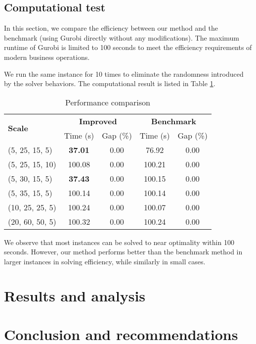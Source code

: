 \documentclass[a4paper,12pt]{article}
\begin{document}
\subsection{Computational test}

In this section, we compare the efficiency between our method and the benchmark (using Gurobi directly without any modifications). The maximum runtime of Gurobi is limited to 100 seconds to meet the efficiency requirements of modern business operations.

We run the same instance for 10 times to eliminate the randomness introduced by the solver behaviors. The computational result is listed in Table \ref{tab:method-comparison}.

\begin{table}[htbp]
    \centering
    \caption{Performance comparison}
    \label{tab:method-comparison}
    \begin{tabular}{lcc|cc}
        \toprule
        \multirow{2}{*}{\textbf{Scale}} & \multicolumn{2}{c|}{\textbf{Improved}} & \multicolumn{2}{c}{\textbf{Benchmark}} \\
        & Time (s) & Gap (\%) & Time (s) & Gap (\%) \\
        \midrule
        (5, 25, 15, 5)   & \textbf{37.01} & 0.00 & 76.92  & 0.00  \\
        (5, 25, 15, 10)   & 100.08 & 0.00 & 100.21  & 0.00  \\
        (5, 30, 15, 5)   & \textbf{37.43}  & 0.00 & 100.15  & 0.00  \\
        (5, 35, 15, 5)  & 100.14  & 0.00 & 100.14  & 0.00 \\
        (10, 25, 25, 5) & 100.24 & 0.00 & 100.07 & 0.00 \\
        (20, 60, 50, 5) & 100.32 & 0.00 & 100.24 & 0.00 \\
        \bottomrule
    \end{tabular}
\end{table}

We observe that most instances can be solved to near optimality within 100 seconds. However, our method performs better than the benchmark method in larger instances in solving efficiency, while similarly in small cases.


\section{Results and analysis}
\section{Conclusion and recommendations}
\end{document}
